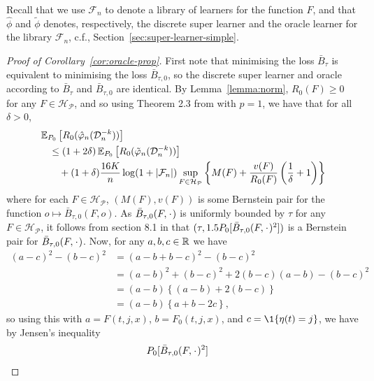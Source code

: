 Recall that we use \( \mathcal{F}_n \) to denote a library of learners for the
function \( F \), and that \( \hat{\phi} \) and \( \tilde{\phi} \) denotes,
respectively, the discrete super learner and the oracle learner for the library
\( \mathcal{F}_n \), c.f., Section~\ref{sec:super-learner-simple}.

\begin{proof}[Proof of Corollary~\ref{cor:oracle-prop}]
  First note that minimising the loss \( \bar{B}_{\tau} \) is equivalent to
  minimising the loss \( \bar{B}_{\tau,0} \), so the discrete super learner and
  oracle according to \( \bar{B}_{\tau} \) and \( \bar{B}_{\tau,0} \) are
  identical. By Lemma~\ref{lemma:norm}, \( R_0(F) \geq 0 \) for any
  \( F \in \mathcal{H}_{\mathcal{P}} \), and so using Theorem 2.3 from
  \citep{vaart2006oracle} with \( p=1 \), we have that for all \( \delta >0 \),
\begin{align*}
  & \operatorname{\mathbb{E}}_{P_0}{\left[ R_0(\hat{\varphi}_n(\mathcal{D}_n^{-k})) \right]}
  \\
  &  \quad \leq
    (1+2\delta)\operatorname{\mathbb{E}}_{P_0}{\left[ R_0(\tilde{\varphi}_n(\mathcal{D}_n^{-k})) \right]}
  \\
  & \qquad + (1+\delta) \frac{16 K}{n}
    \log(1 + |\mathcal{F}_n|)\sup_{F \in \mathcal{H}_{\mathcal{P}}}
    \left\{
    M(F) + \frac{v(F)}{R_0(F)}
    \left(
    \frac{1}{\delta} + 1
    \right)
    \right\}
\end{align*}
where for each \( F \in \mathcal{H}_{\mathcal{P}} \), \( (M(F), v(F)) \) is some Bernstein pair for
the function \(o \mapsto \bar{B}_{\tau,0}(F, o) \). As
\( \bar{B}_{\tau,0}(F, \blank) \) is uniformly bounded by \( \tau \) for any
\( F \in \mathcal{H}_{\mathcal{P}} \), it follows from section 8.1 in \citep{vaart2006oracle} that
\( (\tau, 1.5 P_0{[\bar{B}_{\tau,0}(F, \blank)^2]}) \) is a Bernstein pair for
\( \bar{B}_{\tau,0}(F, \blank) \). Now, for any \( a,b,c \in \mathbb{R} \) we have
\begin{align*}
  (a-c)^2 - (b-c)^2
  & = (a-b+b-c)^2 - (b-c)^2
  \\
  & = (a-b)^2 + (b-c)^2 +2(b-c)(a-b) - (b-c)^2
  \\
  & = (a-b)
    \left\{
    (a-b) +  2(b-c)
    \right\}
  \\
  & = (a-b)
    \left\{
     a + b -2c
    \right\},
\end{align*}
so using this with \( a=F(t, j, x) \), \( b=F_0(t, j, x) \), and
\( c = \1{\{\eta(t) = j\}} \), we have by Jensen's inequality
\begin{align*}
  & P_0{[\bar{B}_{\tau,0}(F, \blank)^2]}

\end{align*}
\end{proof}
